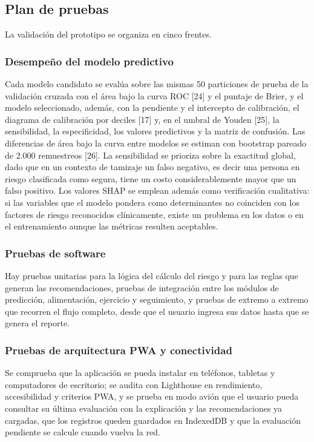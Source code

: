 \documentclass[conference]{IEEEtran}
\begin{document}
\subsection{Plan de pruebas}
La validación del prototipo se organiza en cinco frentes.

\subsubsection{Desempeño del modelo predictivo}
Cada modelo candidato se evalúa sobre las mismas 50 particiones de prueba de la validación cruzada con el área bajo la curva ROC [24] y el puntaje de Brier, y el modelo seleccionado, además, con la pendiente y el intercepto de calibración, el diagrama de calibración por deciles [17] y, en el umbral de Youden [25], la sensibilidad, la especificidad, los valores predictivos y la matriz de confusión. Las diferencias de área bajo la curva entre modelos se estiman con bootstrap pareado de 2.000 remuestreos [26]. La sensibilidad se prioriza sobre la exactitud global, dado que en un contexto de tamizaje un falso negativo, es decir una persona en riesgo clasificada como segura, tiene un costo considerablemente mayor que un falso positivo. Los valores SHAP se emplean además como verificación cualitativa: si las variables que el modelo pondera como determinantes no coinciden con los factores de riesgo reconocidos clínicamente, existe un problema en los datos o en el entrenamiento aunque las métricas resulten aceptables.

\subsubsection{Pruebas de software}
Hay pruebas unitarias para la lógica del cálculo del riesgo y para las reglas que generan las recomendaciones, pruebas de integración entre los módulos de predicción, alimentación, ejercicio y seguimiento, y pruebas de extremo a extremo que recorren el flujo completo, desde que el usuario ingresa sus datos hasta que se genera el reporte.

\subsubsection{Pruebas de arquitectura PWA y conectividad}
Se comprueba que la aplicación se pueda instalar en teléfonos, tabletas y computadores de escritorio; se audita con Lighthouse en rendimiento, accesibilidad y criterios PWA, y se prueba en modo avión que el usuario pueda consultar su última evaluación con la explicación y las recomendaciones ya cargadas, que los registros queden guardados en IndexedDB y que la evaluación pendiente se calcule cuando vuelva la red.
\end{document}
